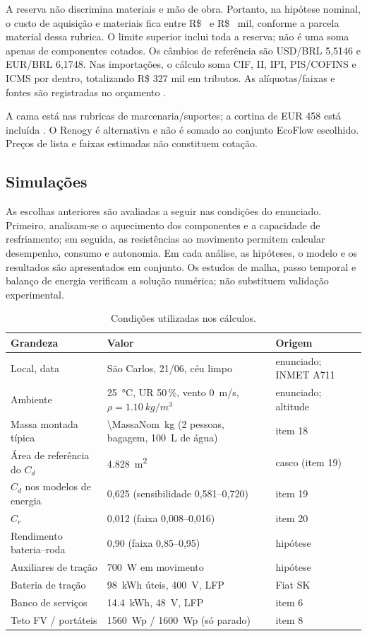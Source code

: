 \documentclass[12pt,a4paper]{article}
\begin{document}
A reserva não discrimina materiais e mão de obra. Portanto, na hipótese nominal,
o custo de aquisição e materiais fica entre R\$ \CustoComponentesMil\ e
R\$ \CustoProjetoMil\ mil, conforme a parcela material dessa rubrica. O limite
superior inclui toda a reserva; não é uma soma apenas de componentes cotados.
Os câmbios de referência são USD/BRL 5,5146 e EUR/BRL 6,1748. Nas importações,
o cálculo soma CIF, II, IPI, PIS/COFINS e ICMS por dentro, totalizando R\$ 327 mil
em tributos. As alíquotas/faixas e fontes são registradas no orçamento \cite{ii35}.

A cama está nas rubricas de marcenaria/suportes; a cortina de EUR 458 está incluída
\cite{remifront}. O Renogy é alternativa e não é somado ao conjunto EcoFlow escolhido.
Preços de lista e faixas estimadas não constituem cotação.
\FloatBarrier
\clearpage
\subsection{Simulações}
As escolhas anteriores são avaliadas a seguir nas condições do enunciado. Primeiro,
analisam-se o aquecimento dos componentes e a capacidade de resfriamento; em seguida,
as resistências ao movimento permitem calcular desempenho, consumo e autonomia.
Em cada análise, as hipóteses, o modelo e os resultados são apresentados em conjunto.
Os estudos de malha, passo temporal e balanço de energia verificam a solução numérica;
não substituem validação experimental.
\begin{table}[htbp]
\centering\small
\caption{Condições utilizadas nos cálculos.}
\label{tab:cenario}
\setlength{\tabcolsep}{3pt}
\begin{tabular}{lll}
\toprule
Grandeza & Valor & Origem \\
\midrule
Local, data & São Carlos, 21/06, céu limpo & enunciado; INMET A711 \\
Ambiente & \SI{25}{\celsius}, UR 50\,\%, vento \SI{0}{m/s}, $\rho = \SI{1,10}{kg/m^3}$ & enunciado; altitude \\
Massa montada típica & \SI{\MassaNom}{kg} (2 pessoas, bagagem, \SI{100}{L} de água) & item 18 \\
Área de referência do $C_d$ & \SI{4,828}{m^2} & casco (item 19) \\
$C_d$ nos modelos de energia & 0,625 (sensibilidade 0,581--0,720) & item 19 \\
$C_r$ & 0,012 (faixa 0,008--0,016) & item 20 \\
Rendimento bateria--roda & 0,90 (faixa 0,85--0,95) & hipótese \\
Auxiliares de tração & \SI{700}{W} em movimento & hipótese \\
Bateria de tração & \SI{98}{kWh} úteis, \SI{400}{V}, LFP & Fiat SK \cite{fiatsk} \\
Banco de serviços & \SI{14,4}{kWh}, \SI{48}{V}, LFP & item 6 \\
Teto FV / portáteis & \SI{1560}{Wp} / \SI{1600}{Wp} (só parado) & item 8 \\
\bottomrule
\end{tabular}
\end{table}
\end{document}
